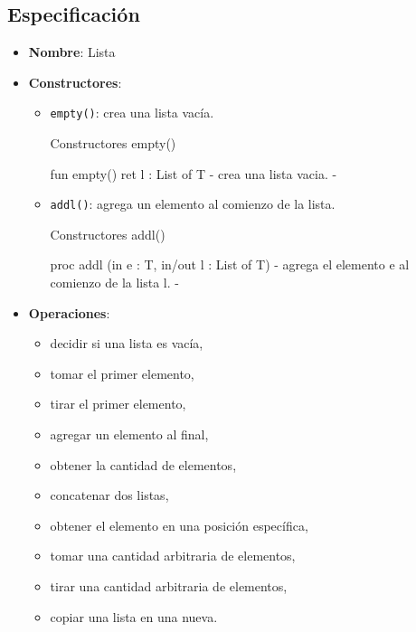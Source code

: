 \subsection{Especificación}
\begin{itemize}
    \item \textbf{Nombre}: Lista
    \item \textbf{Constructores}:
    \begin{itemize}
        \item \texttt{empty()}: crea una lista vacía. 
\begin{codebox}{Constructores}
\footnotesize empty()
\tcblower
\begin{pascallike}
fun empty() ret l : List of T
{- crea una lista vacia. -}
\end{pascallike}
\end{codebox}
        \item \texttt{addl()}: agrega un elemento al comienzo de la lista.
\begin{codebox}{Constructores}
\footnotesize addl()
\tcblower
\begin{pascallike}
proc addl (in e : T, in/out l : List of T)
{- agrega el elemento e al comienzo de la lista l. -}
\end{pascallike}
\end{codebox}
    \end{itemize}
    \item \textbf{Operaciones}:
    \begin{itemize}
        \item decidir si una lista es vacía,
        \item tomar el primer elemento,
        \item tirar el primer elemento,
        \item agregar un elemento al final,
        \item obtener la cantidad de elementos,
        \item concatenar dos listas,
        \item obtener el elemento en una posición específica,
        \item tomar una cantidad arbitraria de elementos,
        \item tirar una cantidad arbitraria de elementos,
        \item copiar una lista en una nueva.
    \end{itemize}
\end{itemize}


